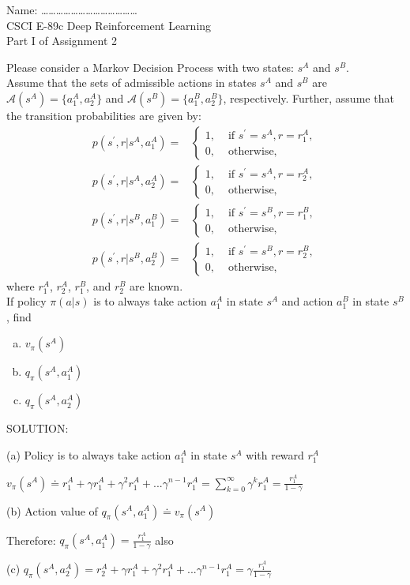 \documentclass[12pt]{letter}
\begin{document}
\begin{flushleft}
{\sc Name: \ldots\ldots\ldots\ldots\ldots\ldots\ldots\ldots\ldots\ldots\ldots\ldots\ldots}\\
CSCI E-89c Deep Reinforcement Learning\\
Part I of Assignment 2\\
\end{flushleft}

Please consider a Markov Decision Process with two states: $s^{A}$ and $s^{B}$.\medskip\\
Assume that the sets of admissible actions in states $s^A$ and $s^B$ are $\mathcal{A}(s^A)=\{a_1^A,a_2^A\}$ and $\mathcal{A}(s^B)=\{a_1^B,a_2^B \}$, respectively. Further, assume that the transition probabilities are given by:
\small{\begin{equation*}
\begin{aligned}
p(s^\prime, r|s^A,a_1^A)=&\begin{cases}
1,& \text{ if } s^\prime=s^A, r=r_1^A,\\
0,& \text{ otherwise},
\end{cases}\\
p(s^\prime, r|s^A,a_2^A)=&\begin{cases}
1,& \text{ if } s^\prime=s^A, r=r_2^A,\\
0,& \text{ otherwise},
\end{cases}\\
p(s^\prime, r|s^B,a_1^B)=&\begin{cases}
1,& \text{ if } s^\prime=s^B, r=r_1^B,\\
0,& \text{ otherwise},
\end{cases}\\
p(s^\prime, r|s^B,a_2^B)=&\begin{cases}
1,& \text{ if } s^\prime=s^B, r=r_2^B,\\
0,& \text{ otherwise},
\end{cases}
\end{aligned}
\end{equation*}}where $r_1^A$, $r_2^A$, $r_1^B$, and $r_2^B$ are known.\medskip\\
If policy $\pi(a|s)$ is to always take action $a_1^A$ in state $s^A$ and action $a_1^B$ in state $s^B$, find
\begin{enumerate}[(a)]
\item $v_\pi(s^A)$
\item $q_\pi(s^A,a_1^A)$
\item $q_\pi(s^A,a_2^A)$
\end{enumerate}
SOLUTION:

(a) Policy is to always take action $a_1^A$ in state $s^A$ with reward $r_1^A$ 

$v_\pi(s^A) \doteq r_1^A + \gamma  r_1^A  + \gamma^2 r_1^A + ... \gamma^{n-1} r_1^A = \sum_{k=0}^\infty \gamma^k r_1^A = \frac{r_1^A}{1 - \gamma}$


(b) Action value of $q_\pi(s^A,a_1^A) \doteq v_\pi(s^A)$

Therefore:
$q_\pi(s^A,a_1^A) = \frac{r_1^A}{1 - \gamma}$ also


(c) $q_\pi(s^A,a_2^A) = r_2^A + \gamma  r_1^A  + \gamma^2 r_1^A + ... \gamma^{n-1} r_1^A = \gamma \frac{r_1^A}{1 - \gamma}$
\end{document}
